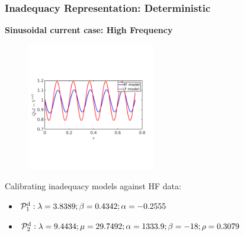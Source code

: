 \documentclass[10pt,xcolor=dvipsnames,compress]{beamer}
\begin{document}
\begin{frame}
\frametitle{Inadequacy Representation: Deterministic}
\textbf{Sinusoidal current case: High Frequency}

\vfill

\begin{figure}
\includegraphics[trim = 0.in  2.3in 0.in 2.8in.in, clip, width=0.5\textwidth]{figs/Isin_high_V_hf_lf.png}
\end{figure}

\vspace{-0.1in}

Calibrating inadequacy models against HF data: 

\begin{itemize}

\item $\mathcal{P}_1^{\rm d}:   \lambda = 3.8389; \beta = 0.4342; \alpha = -0.2555$

\item $\mathcal{P}_2^{\rm d}:   \lambda = 9.4434; \mu = 29.7492; \alpha = 1333.9; \beta = -18; \rho = 0.3079$

\end{itemize}

\vspace{-0.1in}


\end{frame}
\end{document}
